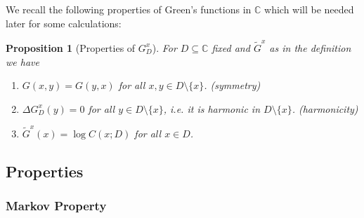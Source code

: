 \documentclass[11pt,reqno]{amsart}
\numberwithin{equation}{section}
\newtheorem{pro}[thm]{Proposition}
\begin{document}
We recall the following properties of Green's functions in $\mathbb C$ which will be needed later for some calculations:

\begin{pro}[Properties of $G_D^x$]\label{prop:propertiesofGreensfcts} For $D\subseteq\mathbb C$ fixed and $\tilde G^x$ as in the definition we have
	\begin{enumerate}
		\item $G(x,y) = G(y,x)$ for all $x,y\in D\setminus\{x\}$. (symmetry)
		\item $\Delta G_D^x(y)=0$ for all $y\in D\setminus\{x\}$, i.e. it is harmonic in $D\setminus\{x\}$. (harmonicity)
		\item\label{item:GreensfctatXisconfRadius} $\tilde G^x(x)=\log C(x;D)$ for all $x\in D$.
	\end{enumerate}
\end{pro}

\subsection{Properties}




\subsubsection{Markov Property}
\end{document}
